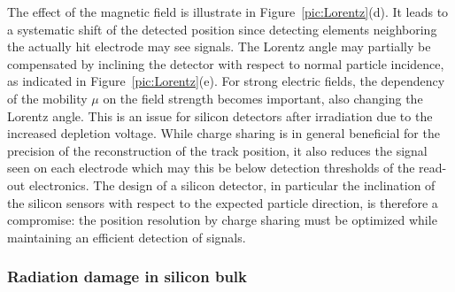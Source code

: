 The effect of the magnetic field is illustrate in Figure~\ref{pic:Lorentz}(d). It leads to a systematic shift of the detected position since detecting elements neighboring the actually hit electrode may see signals. The Lorentz angle may partially be compensated by inclining the detector with respect to normal particle incidence, as indicated in Figure~\ref{pic:Lorentz}(e). For strong electric fields, the dependency of the mobility $\mu$ on the field strength becomes important, also changing the Lorentz angle. This is an issue for silicon detectors after irradiation due to the increased depletion voltage.
While charge sharing is in general beneficial for the precision of the reconstruction of the track position, it also reduces the signal seen on each electrode which may this be below detection thresholds of the read-out electronics. The design of a silicon detector, in particular the inclination of the silicon sensors with respect to the expected particle direction, is therefore a compromise: the position resolution by charge sharing must be optimized while maintaining an efficient detection of signals.


\subsubsection{Radiation damage in silicon bulk}
\label{sec:rad_dam}

